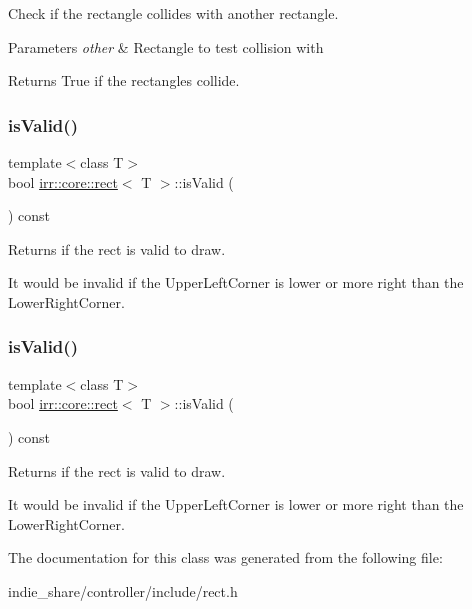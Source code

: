 Check if the rectangle collides with another rectangle. 


\begin{DoxyParams}{Parameters}
{\em other} & Rectangle to test collision with \\
\hline
\end{DoxyParams}
\begin{DoxyReturn}{Returns}
True if the rectangles collide. 
\end{DoxyReturn}
\mbox{\label{classirr_1_1core_1_1rect_ad2f5052c13cffb08f6ce8649296ec9df}} 
\subsubsection{\texorpdfstring{is\+Valid()}{isValid()}\hspace{0.1cm}{\footnotesize\ttfamily [1/2]}}
{\footnotesize\ttfamily template$<$class T$>$ \\
bool \hyperlink{classirr_1_1core_1_1rect}{irr\+::core\+::rect}$<$ T $>$\+::is\+Valid (\begin{DoxyParamCaption}{ }\end{DoxyParamCaption}) const\hspace{0.3cm}{\ttfamily [inline]}}



Returns if the rect is valid to draw. 

It would be invalid if the Upper\+Left\+Corner is lower or more right than the Lower\+Right\+Corner. \mbox{\label{classirr_1_1core_1_1rect_ad2f5052c13cffb08f6ce8649296ec9df}} 
\subsubsection{\texorpdfstring{is\+Valid()}{isValid()}\hspace{0.1cm}{\footnotesize\ttfamily [2/2]}}
{\footnotesize\ttfamily template$<$class T$>$ \\
bool \hyperlink{classirr_1_1core_1_1rect}{irr\+::core\+::rect}$<$ T $>$\+::is\+Valid (\begin{DoxyParamCaption}{ }\end{DoxyParamCaption}) const\hspace{0.3cm}{\ttfamily [inline]}}



Returns if the rect is valid to draw. 

It would be invalid if the Upper\+Left\+Corner is lower or more right than the Lower\+Right\+Corner. 

The documentation for this class was generated from the following file\+:\begin{DoxyCompactItemize}
\item 
indie\+\_\+share/controller/include/rect.\+h\end{DoxyCompactItemize}
